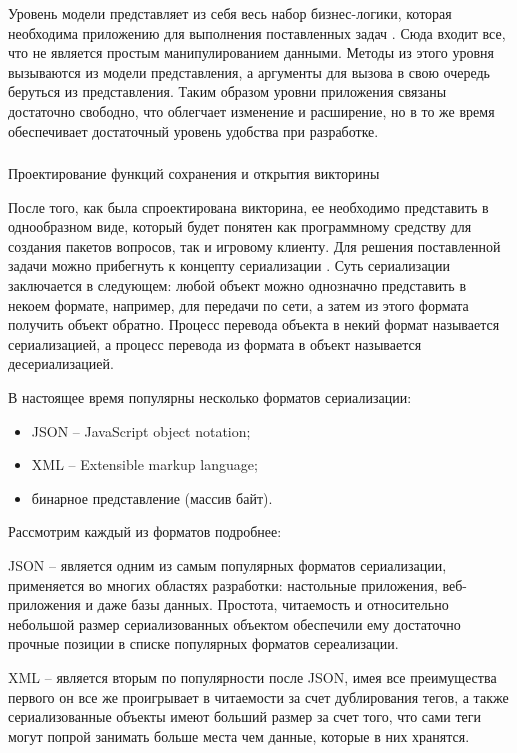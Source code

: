 Уровень модели представляет из себя весь набор бизнес-логики, которая необходима приложению для выполнения поставленных задач \cite{book_mvvm}. 
Сюда входит все, что не является простым манипулированием данными. Методы из этого уровня вызываются из модели представления, а аргументы для вызова в свою очередь беруться из представления.
Таким образом уровни приложения связаны достаточно свободно, что облегчает изменение и расширение, но в то же время обеспечивает достаточный уровень удобства при разработке.

\subsubsection{} Проектирование функций сохранения и открытия викторины
\label{sec:design:tester:open_save}

После того, как была спроектирована викторина, ее необходимо представить в однообразном виде, который будет понятен как программному средству для создания пакетов вопросов, так и
игровому клиенту. Для решения поставленной задачи можно прибегнуть к концепту сериализации \cite{msdn_serialization}. Суть сериализации заключается в следующем:
любой объект можно однозначно представить в некоем формате, например, для передачи по сети, а затем из этого формата получить объект обратно. Процесс перевода объекта в некий формат
называется сериализацией, а процесс перевода из формата в объект называется десериализацией.

В настоящее время популярны несколько форматов сериализации:

\begin{itemize}
	\item JSON -- JavaScript object notation;
	\item XML -- Extensible markup language;
	\item бинарное представление (массив байт).
\end{itemize}

Рассмотрим каждый из форматов подробнее:

JSON -- является одним из самым популярных форматов сериализации, применяется во многих областях разработки: настольные приложения, веб-приложения и даже базы данных. Простота,
читаемость и относительно небольшой размер сериализованных объектом обеспечили ему достаточно прочные позиции в списке популярных форматов сереализации.

XML -- является вторым по популярности после JSON, имея все преимущества первого он все же проигрывает в читаемости за счет дублирования тегов, а также сериализованные объекты
имеют больший размер за счет того, что сами теги могут попрой занимать больше места чем данные, которые в них хранятся.

